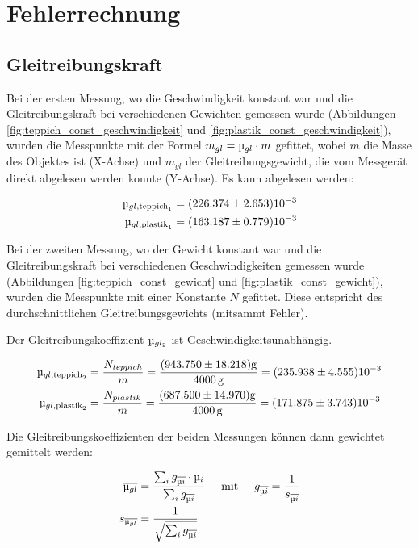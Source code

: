 \section{Fehlerrechnung}

\subsection{Gleitreibungskraft}

Bei   der  ersten  Messung,  wo  die  Geschwindigkeit  konstant  war   und   die
Gleitreibungskraft  bei  verschiedenen  Gewichten  gemessen  wurde  (Abbildungen
\ref{fig:teppich_const_geschwindigkeit}                                      und
\ref{fig:plastik_const_geschwindigkeit}), wurden die Messpunkte  mit  der Formel
$m_{gl} = \micro_{gl} \cdot m$ gefittet, wobei $m$  die  Masse  des Objektes ist
(X-Achse) und $m_{gl}$ der  Gleitreibungsgewicht,  die  vom  Messger\"at  direkt
abgelesen werden konnte (Y-Achse). Es kann abgelesen werden:

\begin{align*}
    \micro_{gl,\textrm{teppich}_1} &= (226.374 \pm 2.653)\num{e-3} \\
    \micro_{gl,\textrm{plastik}_1} &= (163.187 \pm 0.779)\num{e-3}
\end{align*}

Bei der zweiten Messung, wo der Gewicht konstant war und  die Gleitreibungskraft
bei    verschiedenen     Geschwindigkeiten     gemessen    wurde    (Abbildungen
\ref{fig:teppich_const_gewicht} und \ref{fig:plastik_const_gewicht}), wurden die
Messpunkte   mit  einer   Konstante   $N$   gefittet.   Diese   entspricht   des
durchschnittlichen Gleitreibungsgewichts (mitsammt Fehler). 

Der  Gleitreibungskoeffizient $\micro_{gl_2}$  ist  Geschwindigkeitsunabh\"angig.

\begin{align*}
    \micro_{gl,\textrm{teppich}_2} &= \frac{N_{teppich}}{m} = \frac{(943.750 \pm 18.218)\SI{}{\gram}}{\SI{4000}{\gram}} = (235.938 \pm 4.555)\num{e-3} \\
    \micro_{gl,\textrm{plastik}_2} &= \frac{N_{plastik}}{m} = \frac{(687.500 \pm 14.970)\SI{}{\gram}}{\SI{4000}{\gram}} = (171.875 \pm 3.743)\num{e-3}
\end{align*}

Die Gleitreibungskoeffizienten  der  beiden  Messungen  k\"onnen  dann gewichtet
gemittelt werden:

\begin{align*}
    \overline{\micro_{gl}} &= \frac{\sum_i g_{\overline{\micro i}} \cdot \micro_i}{\sum_i g_{\overline{\micro i}}} \hspace{5mm}\textrm{mit}\hspace{5mm} g_{\overline{\micro i}} = \frac{1}{s_{\overline{\micro i}}} \\
    s_{\overline{\micro_{gl}}} &= \frac{1}{\sqrt{\sum_i g_{\overline{\micro i}}}}
\end{align*}

